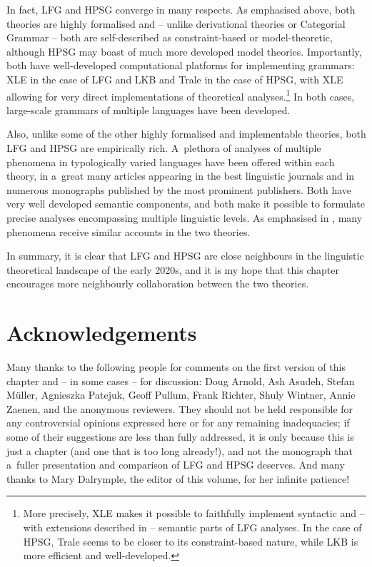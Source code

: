 \documentclass[output=paper,hidelinks]{langscibook}
\begin{document}
In fact, LFG and HPSG converge in many respects.  As emphasised above, both theories are highly formalised and -- unlike derivational theories or Categorial Grammar -- both are self-described as constraint-based or model-theoretic, although HPSG may boast of much more developed model theories.  Importantly, both have well-developed computational platforms for implementing grammars: XLE \citep{xledoc} in the case of LFG and LKB \citep{cope:02} and Trale \citep{trale:03} in the case of HPSG, with XLE allowing for very direct implementations of theoretical analyses.\footnote{More precisely, XLE makes it possible to faithfully implement syntactic and -- with extensions described in \citet{dal:pat:zym:20} -- semantic parts of LFG analyses.  In the case of HPSG, Trale seems to be closer to its constraint-based nature, while LKB is more efficient and well-developed.}  In both cases, large-scale grammars of multiple languages have been developed.

Also, unlike some of the other highly formalised and implementable theories, both LFG and HPSG are empirically rich.  A~plethora of analyses of multiple phenomena in typologically varied languages have been offered within each theory, in a~great many articles appearing in the best linguistic journals and in numerous monographs published by the most prominent publishers.  Both have very well developed semantic components, and both make it possible to formulate precise analyses encompassing multiple linguistic levels.  As emphasised in \citet{wec:asu:20}, many phenomena receive similar accounts in the two theories.

In summary, it is clear that LFG and HPSG are close neighbours in the linguistic theoretical landscape of the early 2020s, and it is my hope that this chapter encourages more neighbourly collaboration between the two theories.

\section*{Acknowledgements}

Many thanks to the following people for comments on the first version of this chapter and -- in some cases -- for discussion: Doug Arnold, Ash Asudeh, Stefan Müller, Agnieszka Patejuk, Geoff Pullum, Frank Richter, Shuly Wintner, Annie Zaenen, and the anonymous reviewers.  They should not be held responsible for any controversial opinions expressed here or for any remaining inadequacies; if some of their suggestions are less than fully addressed, it is only because this is just a chapter (and one that is too long already!\@), and not the monograph that a~fuller presentation and comparison of LFG and HPSG deserves.  And many thanks to Mary Dalrymple, the editor of this volume, for her infinite patience!

{\sloppy\printbibliography[heading=subbibliography,notkeyword=this]}
\end{document}
